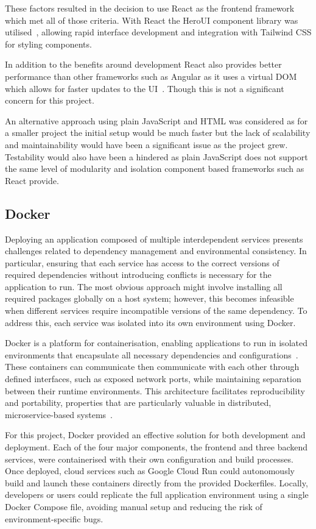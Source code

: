 These factors resulted in the decision to use React as the frontend framework which met all of those criteria. With React the HeroUI component library was utilised~\cite{HeroUI}, allowing rapid interface development and integration with Tailwind CSS for styling components.

In addition to the benefits around development React also provides better performance than other frameworks such as Angular as it uses a virtual DOM which allows for faster updates to the UI~\cite{9959901}. Though this is not a significant concern for this project.

An alternative approach using plain JavaScript and HTML was considered as for a smaller project the initial setup would be much faster but the lack of scalability and maintainability would have been a significant issue as the project grew. Testability would also have been a hindered as plain JavaScript does not support the same level of modularity and isolation component based frameworks such as React provide.

\subsection{Docker}
Deploying an application composed of multiple interdependent services presents challenges related to dependency management and environmental consistency. In particular, ensuring that each service has access to the correct versions of required dependencies without introducing conflicts is necessary for the application to run. The most obvious approach might involve installing all required packages globally on a host system; however, this becomes infeasible when different services require incompatible versions of the same dependency. To address this, each service was isolated into its own environment using Docker.

Docker is a platform for containerisation, enabling applications to run in isolated environments that encapsulate all necessary dependencies and configurations~\cite{DockerDocs}. These containers can communicate then communicate with each other through defined interfaces, such as exposed network ports, while maintaining separation between their runtime environments. This architecture facilitates reproducibility and portability, properties that are particularly valuable in distributed, microservice-based systems~\cite{MerkelDocker,AWSDocker}.

For this project, Docker provided an effective solution for both development and deployment. Each of the four major components, the frontend and three backend services, were containerised with their own configuration and build processes. Once deployed, cloud services such as Google Cloud Run could autonomously build and launch these containers directly from the provided Dockerfiles. Locally, developers or users could replicate the full application environment using a single Docker Compose file, avoiding manual setup and reducing the risk of environment-specific bugs.

